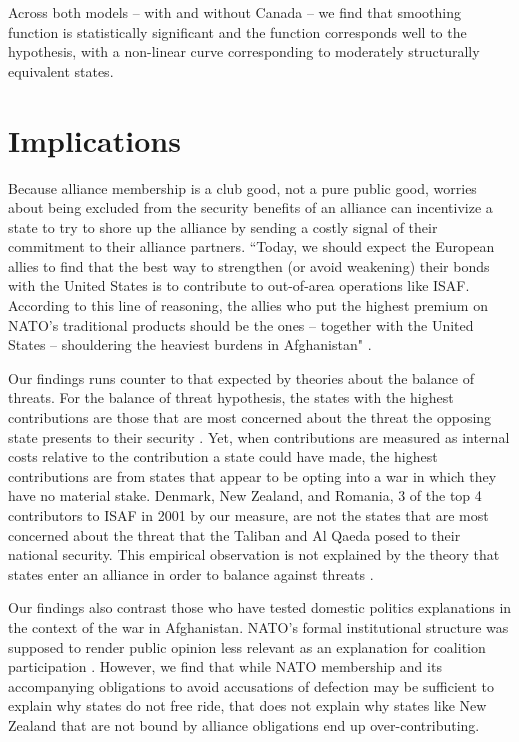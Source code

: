 \documentclass[12pt,letterpaper]{article}
\begin{document}
\begin{figure}[ht]
\begin{minipage}{.5\textwidth}
			\label{fig:test2}
		\end{minipage}
	\end{figure}
	
	Across both models -- with and without Canada -- we find that smoothing function is statistically significant and the function corresponds well to the hypothesis, with a non-linear curve corresponding to moderately structurally equivalent states.

\section{Implications}
	Because alliance membership is a club good, not a pure public good, worries about being excluded from the security benefits of an alliance can incentivize a state to try to shore up the alliance by sending a costly signal of their commitment to their alliance partners. ``Today, we should expect the European allies to find that the best way to strengthen (or avoid weakening) their bonds with the United States is to contribute to out-of-area operations like ISAF. According to this line of reasoning, the allies who put the highest premium on NATO’s traditional products should be the ones – together with the United States – shouldering the heaviest burdens in Afghanistan" \citep{ringsmose_natoburdensharingredux_2010}.

	Our findings runs counter to that expected by theories about the balance of threats. For the balance of threat hypothesis, the states with the highest contributions are those that are most concerned about the threat the opposing state presents to their security \citep{haesebrouck_democraticparticipationair_2016}. Yet, when contributions are measured as internal costs relative to the contribution a state could have made, the highest contributions are from states that appear to be opting into a war in which they have no material stake. Denmark, New Zealand, and Romania, 3 of the top 4 contributors to ISAF in 2001 by our measure, are not the states that are most concerned about the threat that the Taliban and Al Qaeda posed to their national security. This empirical observation is not explained by the theory that states enter an alliance in order to balance against threats \citep{walt_originsalliance_1987}.

	Our findings also contrast those who have tested domestic politics explanations in the context of the war in Afghanistan. NATO's formal institutional structure was supposed to render public opinion less relevant as an explanation for coalition participation \citep{kreps_eliteconsensusdeterminant_2010}. However, we find that while NATO membership and its accompanying obligations to avoid accusations of defection may be sufficient to explain why states do not free ride, that does not explain why states like New Zealand that are not bound by alliance obligations end up over-contributing.
\end{document}
